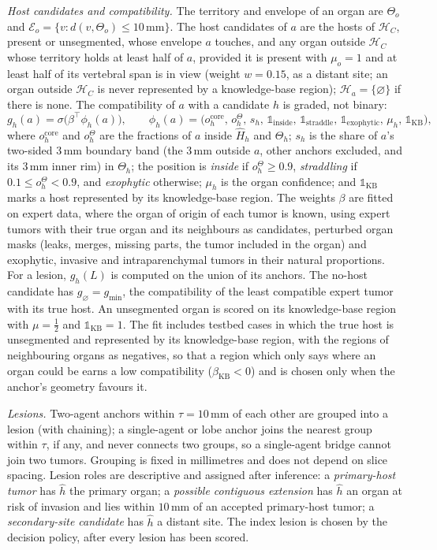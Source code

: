 \documentclass[fleqn,10pt]{olplainarticle}
\begin{document}
\emph{Host candidates and compatibility.} The territory and envelope of an organ are $\Theta_o$ and
$\mathcal{E}_o=\{v:d(v,\Theta_o)\le10\,\mathrm{mm}\}$. The host candidates of $a$ are the hosts of $\mathcal{H}_C$, present
or unsegmented, whose envelope $a$ touches, and any organ outside $\mathcal{H}_C$ whose territory holds at least half of
$a$, provided it is present with $\mu_o=1$ and at least half of its vertebral span is in view (weight $w=0.15$, as a
distant site; an organ outside $\mathcal{H}_C$ is never represented by a knowledge-base region); $\mathcal{H}_a=\{\varnothing\}$ if there is none. The compatibility of $a$ with a
candidate $h$ is graded, not binary:
\begin{equation}
\label{eq:compat}
g_h(a)=\sigma\bigl(\beta^\top\phi_h(a)\bigr),\qquad
\phi_h(a)=\bigl(o^{\mathrm{core}}_h,\,o^{\Theta}_h,\,s_h,\,\mathbb{1}_{\mathrm{inside}},\,\mathbb{1}_{\mathrm{straddle}},\,
\mathbb{1}_{\mathrm{exophytic}},\,\mu_h,\,\mathbb{1}_{\mathrm{KB}}\bigr),
\end{equation}
where $o^{\mathrm{core}}_h$ and $o^{\Theta}_h$ are the fractions of $a$ inside $\hat H_h$ and $\Theta_h$; $s_h$ is the share
of $a$'s two-sided $3$\,mm boundary band (the $3$\,mm outside $a$, other anchors excluded, and its $3$\,mm inner rim) in
$\Theta_h$; the position is \emph{inside} if $o^{\Theta}_h\ge0.9$, \emph{straddling} if $0.1\le o^{\Theta}_h<0.9$, and
\emph{exophytic} otherwise; $\mu_h$ is the organ confidence; and $\mathbb{1}_{\mathrm{KB}}$ marks a host represented by its
knowledge-base region. The weights $\beta$ are fitted on expert data, where the
organ of origin of each tumor is known, using expert tumors with their true organ and its neighbours as candidates,
perturbed organ masks (leaks, merges, missing parts, the tumor included in the organ) and exophytic, invasive and
intraparenchymal tumors in their natural proportions. For a lesion, $g_h(L)$ is computed on the union of its anchors. The
no-host candidate has $g_\varnothing=g_{\min}$, the compatibility of the least compatible expert tumor with its true host. An
unsegmented organ is scored on its knowledge-base region with $\mu=\tfrac12$ and $\mathbb{1}_{\mathrm{KB}}=1$. The fit includes
testbed cases in which the true host is unsegmented and represented by its knowledge-base region, with the regions of
neighbouring organs as negatives, so that a region which only says where an organ could be earns a low compatibility
($\beta_{\mathrm{KB}}<0$) and is chosen only when the anchor's geometry favours it.

\emph{Lesions.} Two-agent anchors within $\tau=10$\,mm of each other are grouped into a lesion (with chaining); a single-agent
or lobe anchor joins the nearest group within $\tau$, if any, and never connects two groups, so a single-agent bridge cannot join
two tumors. Grouping is fixed in millimetres and does not depend on slice
spacing. Lesion roles are descriptive and assigned after inference: a \emph{primary-host tumor} has $\hat h$ the primary
organ; a \emph{possible contiguous extension} has $\hat h$ an organ at risk of invasion and lies within $10$\,mm of an
accepted primary-host tumor; a \emph{secondary-site candidate} has $\hat h$ a distant site. The index lesion is chosen by the
decision policy, after every lesion has been scored.
\end{document}
